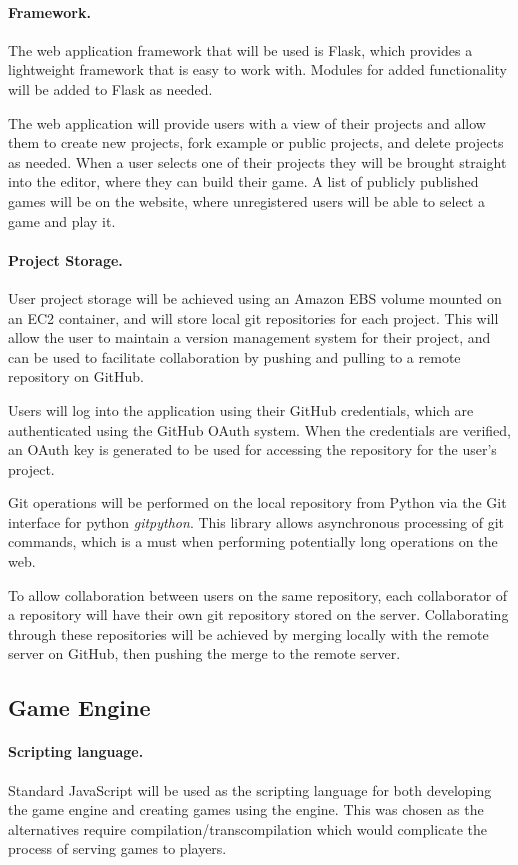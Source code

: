 \documentclass[a4paper, 12pt]{article}
\begin{document}
\paragraph{Framework.}
The web application framework that will be used is Flask, which provides a lightweight framework that is easy to work with. Modules for added functionality will be added to Flask as needed.

The web application will provide users with a view of their projects and allow them to create new projects, fork example or public projects, and delete projects as needed. When a user selects one of their projects they will be brought straight into the editor, where they can build their game. A list of publicly published games will be on the website, where unregistered users will be able to select a game and play it.

\paragraph{Project Storage.}
User project storage will be achieved using an Amazon EBS volume mounted on an EC2 container, and will store local git repositories for each project. This will allow the user to maintain a version management system for their project, and can be used to facilitate collaboration by pushing and pulling to a remote repository on GitHub.

Users will log into the application using their GitHub credentials, which are authenticated using the GitHub OAuth system. When the credentials are verified, an OAuth key is generated to be used for accessing the repository for the user's project.

Git operations will be performed on the local repository from Python via the Git interface for python \emph{gitpython}. This library allows asynchronous processing of git commands, which is a must when performing potentially long operations on the web.

To allow collaboration between users on the same repository, each collaborator of a repository will have their own git repository stored on the server. Collaborating through these repositories will be achieved by merging locally with the remote server on GitHub, then pushing the merge to the remote server.

\subsection{Game Engine}
\paragraph{Scripting language.}
Standard JavaScript will be used as the scripting language for both developing the game engine and creating games using the engine. This was chosen as the alternatives require compilation/transcompilation which would complicate the process of serving games to players.
\end{document}
